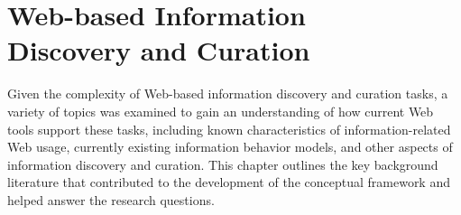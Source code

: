 \chapter{Web-based Information \\Discovery and Curation}
\label{chapter:chapter_related_work}

Given the complexity of Web-based information discovery and curation tasks, a variety of topics was examined to gain an understanding of how current Web tools support these tasks, including known characteristics of information-related Web usage, currently existing information behavior models, and other aspects of information discovery and curation.  This chapter outlines the key background literature that contributed to the development of the conceptual framework and helped answer the research questions. 


